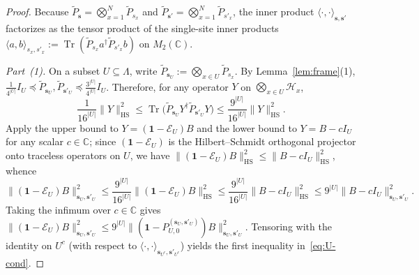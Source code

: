 \documentclass[11pt,a4paper]{article}
\numberwithin{equation}{section}
\theoremstyle{plain}
\theoremstyle{definition}
\newcommand{\HS}{\mathrm{HS}}
\newcommand{\Tr}{\operatorname{Tr}}
\begin{document}
\begin{proof}
Because $\widetilde{P}_{\mathbf{s}} = \bigotimes_{x=1}^N\widetilde{P}_{s_x}$ and $\widetilde{P}_{\mathbf{s}'} = \bigotimes_{x=1}^N\widetilde{P}_{s'_x}$, the inner product $\langle\cdot,\cdot\rangle_{\mathbf{s},\mathbf{s}'}$ factorizes as the tensor product of the single-site inner products $\langle a,b\rangle_{s_x,s'_x} := \Tr(\widetilde{P}_{s_x} a^\dagger \widetilde{P}_{s'_x} b)$ on $M_2(\mathbb{C})$.

\emph{Part~(1).} On a subset $U\subseteq\Lambda$, write $\widetilde{P}_{\mathbf{s}_U} := \bigotimes_{x\in U}\widetilde{P}_{s_x}$. By Lemma~\ref{lem:frame}(1), $\frac{1}{4^{|U|}}I_U \preceq \widetilde{P}_{\mathbf{s}_U}, \widetilde{P}_{\mathbf{s}'_U} \preceq \frac{3^{|U|}}{4^{|U|}}I_U$. Therefore, for any operator $Y$ on $\bigotimes_{x\in U}\mathcal{H}_x$,
\[
  \frac{1}{16^{|U|}}\|Y\|_\HS^2
  \le \Tr\bigl(\widetilde{P}_{\mathbf{s}_U} Y^\dagger \widetilde{P}_{\mathbf{s}'_U} Y\bigr)
  \le \frac{9^{|U|}}{16^{|U|}}\|Y\|_\HS^2.
\]
Apply the upper bound to $Y = (\mathbf{1}-\mathcal{E}_U)B$ and the lower bound to $Y = B - c I_U$ for any scalar $c\in\mathbb{C}$; since $(\mathbf{1}-\mathcal{E}_U)$ is the Hilbert--Schmidt orthogonal projector onto traceless operators on $U$, we have $\|(\mathbf{1}-\mathcal{E}_U)B\|_\HS^2 \le \|B - cI_U\|_\HS^2$, whence
\[
  \bigl\|(\mathbf{1}-\mathcal{E}_U)B\bigr\|_{\mathbf{s}_U,\mathbf{s}'_U}^2
  \le \frac{9^{|U|}}{16^{|U|}}\bigl\|(\mathbf{1}-\mathcal{E}_U)B\bigr\|_\HS^2
  \le \frac{9^{|U|}}{16^{|U|}}\|B - cI_U\|_\HS^2
  \le 9^{|U|}\|B - cI_U\|_{\mathbf{s}_U,\mathbf{s}'_U}^2.
\]
Taking the infimum over $c\in\mathbb{C}$ gives $\|(\mathbf{1}-\mathcal{E}_U)B\|_{\mathbf{s}_U,\mathbf{s}'_U}^2 \le 9^{|U|}\|(\mathbf{1}-P_{U,0}^{(\mathbf{s}_U,\mathbf{s}'_U)})B\|_{\mathbf{s}_U,\mathbf{s}'_U}^2$. Tensoring with the identity on $U^c$ (with respect to $\langle\cdot,\cdot\rangle_{\mathbf{s}_{U^c},\mathbf{s}'_{U^c}}$) yields the first inequality in~\eqref{eq:U-cond}.


\end{proof}
\end{document}
